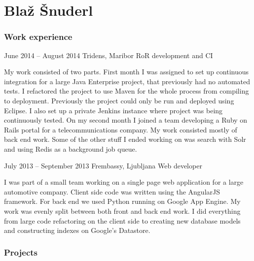 \documentclass{tccv}
\begin{document}
\part{Blaž Šnuderl}

\section{Work experience}

\begin{eventlist}

\item{June 2014 -- August 2014}
     {Tridens, Maribor}
     {RoR development and CI}

My work consisted of two parts. First month I was assigned to set up continuous integration for a large Java Enterprise project, that previously had no automated tests. I refactored the project to use Maven for the whole process from compiling to deployment. Previously the project could only be run and deployed using Eclipse. I also set up a private Jenkins instance where project was being continuously tested. 
\newline
On my second month I joined a team developing a Ruby on Rails portal for a telecommunications company. My work consisted mostly of back end work. Some of the other stuff I ended working on was search with Solr and using Redis as a background job queue.

\item{July 2013 -- September 2013}
     {Frembassy, Ljubljana}
     {Web developer}
     
I was part of a small team working on a single page web application for a large automotive company. Client side code was written using the AngularJS framework. For back end we used Python running on Google App Engine. My work was evenly split between both front and back end work. I did everything from large code refactoring on the client side to creating new database models and constructing indexes on Google's Datastore.

\end{eventlist}


\section{Projects}
\end{document}

